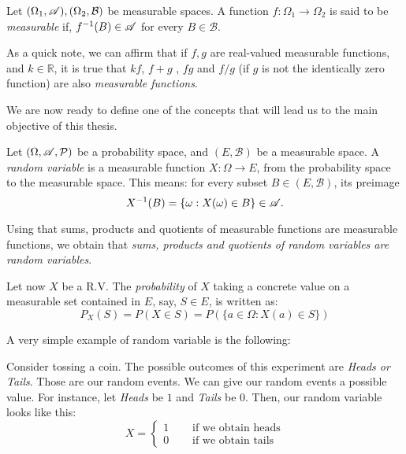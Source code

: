 \begin{ndef}
Let $(\Omega_1, \mathscr{A}),(\Omega_2, \mathcal B)$ be measurable spaces. A function $f: \Omega_1 \to \Omega_2$ is said to be \emph{measurable} if, $f^{-1}(B) \in \mathscr{A}$ for every $B \in \mathcal B$.
\end{ndef}

As a quick note, we can affirm that if $f,g$ are real-valued measurable functions, and $k \in \mathbb R$, it is true that $kf$, $f+g$ , $fg$ and $f/g$ (if $g$ is not the identically zero function) are also \emph{measurable functions}.

We are now ready to define one of the concepts that will lead us to the main objective of this thesis.

\begin{ndef}
Let $(\Omega,\mathscr{A},\mathcal{P})$ be a probability space, and $(E,\mathcal B)$ be a measurable space. 
A \emph{random variable} is a measurable function $X: \Omega \to E$, from the probability space to the measurable space. This means: for every subset $B \in (E,\mathcal B)$, its preimage
$$
X^{-1}(B) = \{\omega : X(\omega) \in B\} \in \mathscr{A} .
$$
\end{ndef}

Using that sums, products and quotients of measurable functions are measurable functions, we obtain that \emph{sums, products and quotients of random variables are random variables}.

Let now $X$ be a R.V. The \emph{probability} of $X$ taking a concrete value on a measurable set contained in $E$, say, $S \in E$, is written as:
$$
P_X(S) = P(X \in S) = P(\{a \in \Omega : X(a) \in S\})
$$

A very simple example of random variable is the following:

\begin{nexample}
  Consider tossing a coin. The possible outcomes of this experiment are \emph{Heads or Tails}. Those are our random events. We can give our random events a possible value. 
  For instance, let \emph{Heads} be $1$ and \emph{Tails} be $0$. Then, our random variable looks like this:
  \begin{equation*}
      X  = \left\{ \begin{aligned}
  1 \quad & \text{ if we obtain heads} \\
  0 \quad & \text{ if we obtain tails}
\end{aligned}\right.
  \end{equation*}

\end{nexample}

